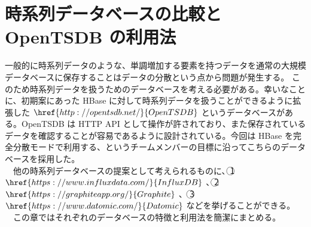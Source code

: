 \documentclass{scrartcl}
\begin{document}
\section{時系列データベースの比較と OpenTSDB の利用法}
\label{sec:orga6d806a}
一般的に時系列データのような、単調増加する要素を持つデータを通常の大規模データベースに保存することはデータの分散という点から問題が発生する。 \cite{hbase-reference} このため時系列データを扱うためのデータベースを考える必要がある。幸いなことに、初期案にあった HBase に対して時系列データを扱うことができるように拡張した \(\href{http://opentsdb.net/}{OpenTSDB}\) というデータベースがある。OpenTSDB は HTTP API として操作が許されており、また保存されているデータを確認することが容易であるように設計されている。今回は HBase を完全分散モードで利用する、というチームメンバーの目標に沿ってこちらのデータベースを採用した。\\
　他の時系列データベースの提案として考えられるものに、\textcircled{\scriptsize 1} \(\href{https://www.influxdata.com/}{InfluxDB}\) 、\textcircled{\scriptsize 2} \(\href{https://graphiteapp.org/}{Graphite}\) 、 \textcircled{\scriptsize 3} \(\href{https://www.datomic.com/}{Datomic}\) などを挙げることができる。\\
　この章ではそれぞれのデータベースの特徴と利用法を簡潔にまとめる。\\
\end{document}
